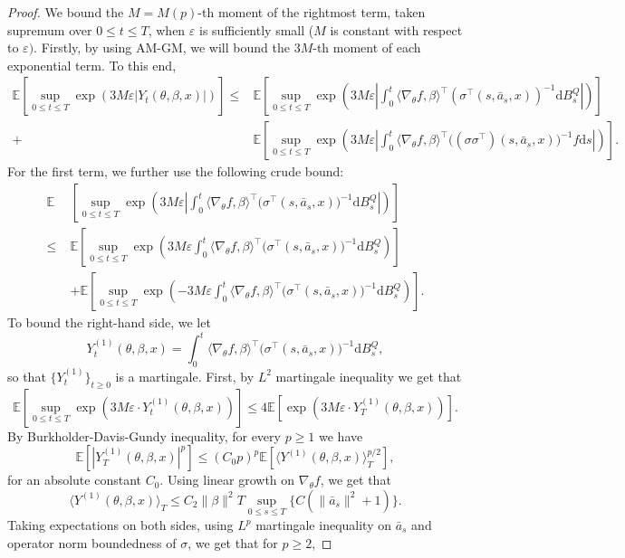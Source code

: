 \documentclass{article}
\newcommand{\eps}{\epsilon}
\newcommand{\1}{\mathbbm{1}}
\newcommand{\E}{\mathbb E}
\renewcommand{\H}{\mathcal{H}}
\numberwithin{equation}{section}
\def\eps{\varepsilon}
\def\E{{\bf E}} \def\H{{\bf H}} \def\J{{\bf J}}
\def\d{{\mathrm{d}}}
\def\E{\mathbb{E}}
\begin{document}
\begin{proof}
We bound the $M=M(p)$-th moment of the rightmost term, taken supremum over $0\leq t\leq T$, when $\eps$ is sufficiently small ($M$ is constant with respect to $\eps)$. Firstly, by using AM-GM, we will bound the $3M$-th moment of each exponential term. To this end,
\begin{align*}
\mathbb{E}\left[\sup_{0\leq t\leq T}\exp\left(3M\eps|Y_{t}(\theta, \beta, x)|\right)\right]\leq&\E\left[\sup_{0\leq t\leq T}\exp\left(3M\eps\left|\int_{0}^{t}\langle \nabla_{\theta}f, \beta\rangle^{\top}(\sigma^\top(s, \bar a_{s}, x))^{-1}\d B_{s}^{Q}\right|\right)\right]\\
+&\E\left[\sup_{0\leq t\leq T}\exp\left(3M\eps\left|\int_{0}^{t}\langle \nabla_{\theta} f, \beta\rangle^{\top}\big((\sigma\sigma^\top)(s, \bar a_{s}, x)\big)^{-1}f \d s\right|\right)\right].
\end{align*}
For the first term, we further use the following crude bound:
\begin{align*}
\E&\left[\sup_{0\leq t\leq T}\exp\left(3M\eps\left|\int_{0}^{t}\langle \nabla_{\theta}f, \beta\rangle^{\top}\big(\sigma^\top(s, \bar a_{s}, x)\big)^{-1}\d B_{s}^{Q}\right|\right)\right]
\\
\leq\;&\E\left[\sup_{0\leq t\leq T}\exp\left(3M\eps\int_{0}^{t}\langle \nabla_{\theta}f, \beta\rangle^{\top}\big(\sigma^\top(s, \bar a_{s}, x)\big)^{-1}\d B_{s}^{Q}\right)\right]\\
&+\E\left[\sup_{0\leq t\leq T}\exp\left(-3M\eps\int_{0}^{t}\langle \nabla_{\theta}f, \beta\rangle^{\top}\big(\sigma^\top(s, \bar a_{s}, x)\big)^{-1}\d B_{s}^{Q}\right)\right].
\end{align*}
To bound the right-hand side, we let
$$Y_{t}^{(1)}(\theta, \beta, x)=\int_{0}^{t}\langle \nabla_{\theta} f,\beta\rangle^{\top}\big(\sigma^\top(s, \bar a_{s}, x)\big)^{-1}\d B_{s}^{Q},$$
so that $\{Y_{t}^{(1)}\}_{t\geq 0}$ is a martingale. First, by $L^{2}$ martingale inequality we get that
$$\E\left[\sup_{0\leq t\leq T}\exp\left(3M\eps\cdot Y_{t}^{(1)}(\theta,\beta, x)\right)\right]\leq 4\E\left[\exp\left(3M\eps\cdot Y_{T}^{(1)}(\theta, \beta, x)\right)\right].$$
By Burkholder-Davis-Gundy inequality, for every $p\geq 1$ we have
$$\E\left[|Y_{T}^{(1)}(\theta,\beta, x)|^{p}\right]\leq (C_{0}p)^{p}\E[\langle Y^{(1)}(\theta,\beta, x)\rangle_{T}^{p/2}],$$
for an absolute constant $C_{0}$. Using linear growth on $\nabla_{\theta} f$, we get that
$$\langle Y^{(1)}(\theta,\beta, x)\rangle_{T}\leq C_{2}\|\beta\|^{2}T\sup_{0\leq s\leq T}\{C(\|\bar a_{s}\|^{2}+1)\}.$$
Taking expectations on both sides, using $L^{p}$ martingale inequality on $\bar a_{s}$ and operator norm boundedness of $\sigma$, we get that for $p\geq 2$,

\end{proof}
\end{document}
